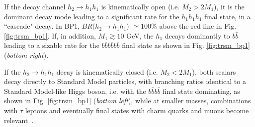 If the decay channel $h_2 \rightarrow h_1 h_1$ is kinematically open (i.e. $M_2 > 2M_1$), it is the dominant decay mode leading to a significant rate for the $h_1 h_1 h_1$ final state, in a ``cascade" decay. In BP1, $BR(h_2 \rightarrow h_1h_1$) $\simeq 100\%$ above the red line in Fig. \ref{fig:trsm_bp1}. If, in addition, $M_1 \gtrsim 10$ GeV, the $h_1$ decays dominantly to $b\bar{b}$ leading to a sizable rate for the $b\bar{b}b\bar{b}b\bar{b}$ final state as shown in Fig. \ref{fig:trsm_bp1} (\textit{bottom right}).

If the $h_2 \rightarrow h_1 h_1$ decay is kinematically closed (i.e. $M_2 < 2M_1$), both scalars decay directly to Standard Model particles, with branching ratios identical to a Standard Model-like Higgs boson, i.e. with the $b\bar{b}b\bar{b}$ final state dominating, as shown in Fig. \ref{fig:trsm_bp1} (\textit{bottom left}), while at smaller masses, combinations with $\tau$ leptons and eventually final states with charm quarks and muons become relevant~\cite{Robens:2019kga}.
